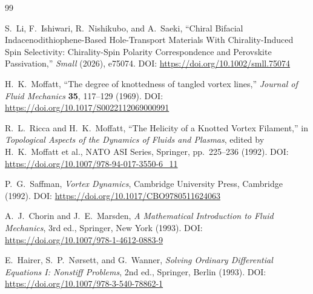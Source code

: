 \begin{thebibliography}{99}

S.~Li, F.~Ishiwari, R.~Nishikubo, and A.~Saeki,
``Chiral Bifacial Indacenodithiophene-Based Hole-Transport Materials With Chirality-Induced Spin Selectivity: Chirality-Spin Polarity Correspondence and Perovskite Passivation,''
\textit{Small} (2026), e75074.
DOI: \url{https://doi.org/10.1002/smll.75074}

H.~K.~Moffatt,
``The degree of knottedness of tangled vortex lines,''
\textit{Journal of Fluid Mechanics} \textbf{35}, 117--129 (1969).
DOI: \url{https://doi.org/10.1017/S0022112069000991}

R.~L.~Ricca and H.~K.~Moffatt,
``The Helicity of a Knotted Vortex Filament,''
in \textit{Topological Aspects of the Dynamics of Fluids and Plasmas}, edited by H.~K.~Moffatt et al.,
NATO ASI Series, Springer, pp.~225--236 (1992).
DOI: \url{https://doi.org/10.1007/978-94-017-3550-6_11}

P.~G.~Saffman,
\textit{Vortex Dynamics},
Cambridge University Press, Cambridge (1992).
DOI: \url{https://doi.org/10.1017/CBO9780511624063}

A.~J.~Chorin and J.~E.~Marsden,
\textit{A Mathematical Introduction to Fluid Mechanics}, 3rd ed.,
Springer, New York (1993).
DOI: \url{https://doi.org/10.1007/978-1-4612-0883-9}

E.~Hairer, S.~P.~N\o rsett, and G.~Wanner,
\textit{Solving Ordinary Differential Equations I: Nonstiff Problems}, 2nd ed.,
Springer, Berlin (1993).
DOI: \url{https://doi.org/10.1007/978-3-540-78862-1}

\end{thebibliography}
